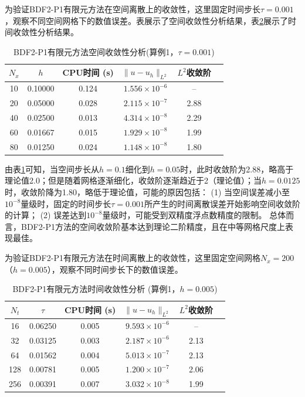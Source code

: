 \documentclass{GZUbachelorthesis}
\theoremstyle{chineseplain}
\begin{document}
为验证BDF2-P1有限元方法在空间离散上的收敛性，这里固定时间步长$\tau=0.001$，观察不同空间网格下的数值误差。表展示了空间收敛性分析结果，表\ref{tab:temporal_convergence}展示了时间收敛性分析结果。
\begin{table}[htbp]
	\centering
	\songti
	\caption{BDF2-P1有限元方法空间收敛性分析(算例1，$\tau=0.001$)}
	\label{tab:spatial_convergence}
	\begin{tabular}{cccccc}
		\toprule
		$N_x$ & $h$  & CPU时间 (s) & $\|u - u_h\|_{L^2}$ & $L^2$收敛阶 \\
		\midrule
		10  & 0.10000 & 0.124 & $1.556 \times 10^{-6}$ & -- \\
		20  & 0.05000 & 0.028 & $2.115 \times 10^{-7}$ & 2.88 \\
		40  & 0.02500 & 0.013 & $4.314 \times 10^{-8}$ & 2.29 \\
		60  & 0.01667 & 0.015 & $1.929 \times 10^{-8}$ & 1.99 \\
		80  & 0.01250 & 0.024 & $1.148 \times 10^{-8}$ & 1.80 \\
		\bottomrule
	\end{tabular}
\end{table}

由表\ref{tab:spatial_convergence}可知，当空间步长从$h=0.1$细化到$h=0.05$时，此时收敛阶为2.88，略高于理论值2.0；但是随着网格逐渐细化，收敛阶逐渐趋近于2（理论值）；当$h=0.0125$时，收敛阶降为1.80，略低于理论值，可能的原因包括：
(1) 当空间误差减小至$10^{-8}$量级时，固定的时间步长$\tau=0.001$所产生的时间离散误差开始影响空间收敛阶的计算；
(2) 误差达到$10^{-8}$量级时，可能受到双精度浮点数精度的限制。
总体而言，BDF2-P1方法的空间收敛阶基本达到理论二阶精度，且在中等网格尺度上表现最佳。

为验证BDF2-P1有限元方法在时间离散上的收敛性，这里固定空间网格$N_x=200$（$h=0.005$），观察不同时间步长下的数值误差。
\begin{table}[htbp]
	\centering
	\songti
	\caption{BDF2-P1有限元方法时间收敛性分析 (算例1，$h=0.005$)}
	\label{tab:temporal_convergence}
	\begin{tabular}{cccccc}
		\toprule
		$N_t$ & $\tau$ & CPU时间 (s) & $\|u - u_h\|_{L^2}$ & $L^2$收敛阶 \\
		\midrule
		16  & 0.06250 & 0.005 & $9.593 \times 10^{-6}$ & -- \\
		32  & 0.03125 & 0.003 & $2.187 \times 10^{-6}$ & 2.13 \\
		64  & 0.01562 & 0.004 & $5.013 \times 10^{-7}$ & 2.13 \\
		128 & 0.00781 & 0.005 & $1.200 \times 10^{-7}$ & 2.06 \\
		256 & 0.00391 & 0.007 & $3.032 \times 10^{-8}$ & 1.99 \\
		\bottomrule
	\end{tabular}
\end{table}
\end{document}
